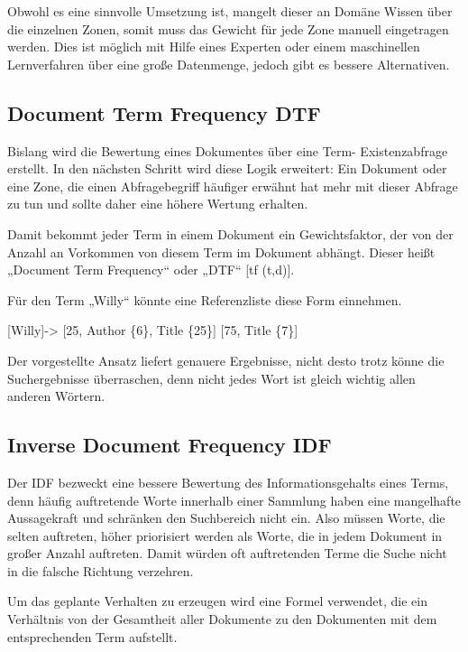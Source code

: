 Obwohl es eine sinnvolle Umsetzung ist, mangelt dieser an Domäne Wissen
über die einzelnen Zonen, somit muss das Gewicht für jede Zone manuell
eingetragen werden. Dies ist möglich mit Hilfe eines Experten oder
einem maschinellen Lernverfahren über eine große Datenmenge, jedoch
gibt es bessere Alternativen. 

\subsection[Document Term Frequency DTF]{Document Term Frequency DTF}

Bislang wird die Bewertung eines Dokumentes über eine Term-
Existenzabfrage erstellt. In den nächsten Schritt wird diese Logik
erweitert: Ein Dokument oder eine Zone, die einen Abfragebegriff
häufiger erwähnt hat mehr mit dieser Abfrage zu tun und sollte daher
eine höhere Wertung erhalten.

Damit bekommt jeder Term in einem Dokument ein Gewichtsfaktor, der von
der Anzahl an Vorkommen von diesem Term im Dokument abhängt. Dieser
heißt „Document Term Frequency“ oder „DTF“ [tf (t,d)]. 

Für den Term „Willy“ könnte eine Referenzliste diese Form einnehmen.


[Willy]-{\textgreater} [25, Author \{6\}, Title \{25\}] [75, Title
\{7\}]

Der vorgestellte Ansatz liefert genauere Ergebnisse, nicht desto trotz
könne die Suchergebnisse überraschen, denn nicht jedes Wort ist gleich
wichtig allen anderen Wörtern. 


\subsection[Inverse Document Frequency IDF]{Inverse Document Frequency
IDF}

Der IDF bezweckt eine bessere Bewertung des Informationsgehalts eines
Terms, denn häufig auftretende Worte innerhalb einer Sammlung haben
eine mangelhafte Aussagekraft und schränken den Suchbereich nicht ein.
Also müssen Worte, die selten auftreten, höher priorisiert werden als
Worte, die in jedem Dokument in großer Anzahl auftreten. Damit würden
oft auftretenden Terme die Suche nicht in die falsche Richtung
verzehren. 




Um das geplante Verhalten zu erzeugen wird eine Formel verwendet, die
ein Verhältnis von der Gesamtheit aller Dokumente zu den Dokumenten mit
dem entsprechenden Term aufstellt.

